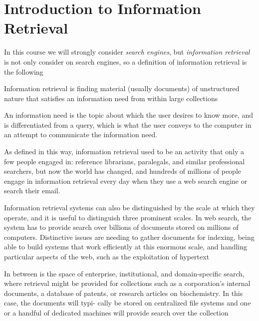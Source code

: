 \chapter{Introduction to Information Retrieval}
In this course we will strongly consider \emph{search engines}, but \emph{information retrieval} is not
only consider on search engines, so a definition of information retrieval is the following

\begin{defi}
Information retrieval is finding material (usually documents) of unstructured nature that satisfies
an information need from within large collections
\end{defi}
An information need is the topic about which the user desires to know more, and is differentiated from a query,
which is what the user conveys to the computer in an attempt to communicate the information need.

As defined in this way, information retrieval used to be an activity that only a few people engaged in:
reference librarians, paralegals, and similar professional searchers, but now the world has changed,
and hundreds of millions of people engage in information retrieval every day when 
they use a web search engine or search their email.

Information retrieval systems can also be distinguished by the scale at
which they operate, and it is useful to distinguish three prominent scales.
In web search, the system has to provide search over billions of documents
stored on millions of computers. Distinctive issues are needing to gather
documents for indexing, being able to build systems that work efficiently
at this enormous scale, and handling particular aspects of the web, such as
the exploitation of hypertext

In between is the space of enterprise,
institutional, and domain-specific search, where retrieval might be provided for
collections such as a corporation’s internal documents, a database of patents,
or research articles on biochemistry. In this case, the documents will typi-
cally be stored on centralized file systems and one or a handful of dedicated
machines will provide search over the collection

